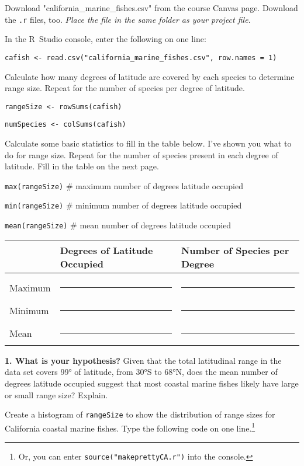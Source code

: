\documentclass[11pt]{article}
\begin{document}
Download "california\_marine\_fishes.csv" from the course Canvas page. Download the \texttt{.r} files, too. \textit{Place the file in the same folder as your project file.}

In the R~Studio console, enter the following on one line:

\texttt{cafish \textless{}-
read.csv("california\_marine\_fishes.csv", row.names = 1)}

Calculate how many degrees of latitude are covered by each
species to determine range size. Repeat for the number of species per
degree of latitude.

\texttt{rangeSize \textless{}- rowSums(cafish)}

\texttt{numSpecies \textless{}- colSums(cafish)}

Calculate some basic statistics to fill in the table below. I've shown
you what to do for range size. Repeat for the number of species present
in each degree of latitude. Fill in the table on the next page.

\texttt{max(rangeSize)} \qquad \# maximum number of degrees latitude occupied

\texttt{min(rangeSize)} \qquad \# minimum number of degrees latitude occupied

\texttt{mean(rangeSize)} \qquad \# mean number of degrees latitude occupied

\begin{tabular}[l]{@{}lL{1.6in}L{1.6in}@{}}
\toprule
& Degrees of Latitude Occupied & Number of Species per Degree\tabularnewline
\midrule
 & & \\[1ex]
Maximum & \rule{1.5in}{0.4pt} & \rule{1.5in}{0.4pt} \tabularnewline[2ex]
Minimum & \rule{1.5in}{0.4pt} & \rule{1.5in}{0.4pt} \tabularnewline[2ex]
Mean & \rule{1.5in}{0.4pt} & \rule{1.5in}{0.4pt} \tabularnewline
\bottomrule
\end{tabular}

\bigskip

\textbf{1. What is your hypothesis?} Given that the total latitudinal range in
the data set covers 99° of latitude, from 30°S to 68°N, does the mean
number of degrees latitude occupied suggest that most coastal marine
fishes likely have large or small range size? Explain.

\vspace{9\baselineskip}

Create a histogram of \texttt{rangeSize} to show the distribution of range sizes for California coastal marine fishes. Type the following code on one line.\footnote{Or, you can enter \texttt{source("makeprettyCA.r")} into the console.}
\end{document}
